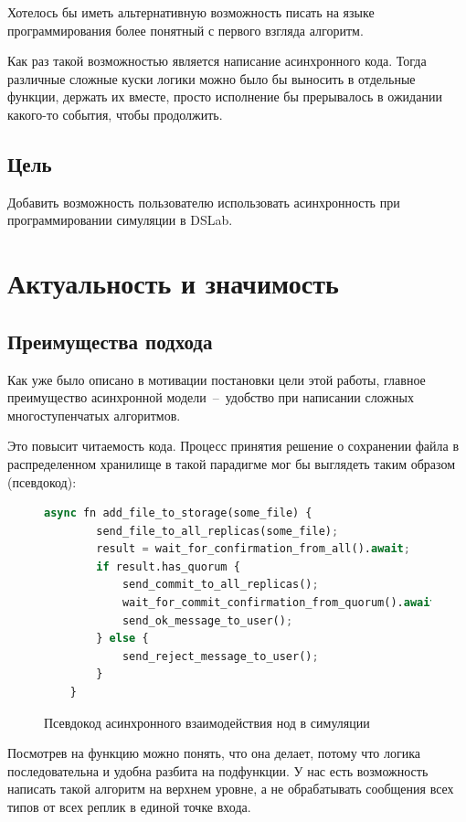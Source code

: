 Хотелось бы иметь альтернативную возможность писать на языке программирования более понятный с первого взгляда алгоритм.

Как раз такой возможностью является написание асинхронного кода. Тогда различные сложные куски логики можно было бы выносить в отдельные функции, держать их вместе, просто исполнение бы прерывалось в ожидании какого-то события, чтобы продолжить.

\subsection{Цель}

Добавить возможность пользователю использовать асинхронность при программировании симуляции в DSLab.

\newpage

\section{Актуальность и значимость}

\subsection{Преимущества подхода}

Как уже было описано в мотивации постановки цели этой работы, главное преимущество асинхронной модели~--~удобство при написании сложных многоступенчатых алгоритмов.

Это повысит читаемость кода. Процесс принятия решение о сохранении файла в распределенном хранилище в такой парадигме мог бы выглядеть таким образом (псевдокод):

\begin{figure}[H]
\begin{lstlisting}[language=Python]
    async fn add_file_to_storage(some_file) {
        send_file_to_all_replicas(some_file);
        result = wait_for_confirmation_from_all().await;
        if result.has_quorum {
            send_commit_to_all_replicas();
            wait_for_commit_confirmation_from_quorum().await;
            send_ok_message_to_user();
        } else {
            send_reject_message_to_user();
        }
    }
\end{lstlisting}
\caption{Псевдокод асинхронного взаимодействия нод в симуляции}
\label{pseudocode}
\end{figure}

Посмотрев на функцию можно понять, что она делает, потому что логика последовательна и удобна разбита на подфункции. У нас есть возможность написать такой алгоритм на верхнем уровне, а не обрабатывать сообщения всех типов от всех реплик в единой точке входа.

